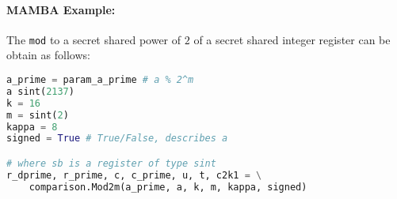  \iffalse
    ### NPS: This does not seem to be defined, or used
    \msubsubsection{$\mathsf{Mod2m}(a_{prime}, \sshare{a},k,\sshare{m}, \kappa)$:}
    This does the same operation as $\mathsf{Mod2m}$ above, but $m$ is now secret shared.
    \begin{enumerate}
      \item $\sshare{x_0},\ldots,\sshare{x_{k-1}}, \sshare{2^m} \asn \mathsf{B2U}(\sshare{m},k)$.
      \item $\sshare{2^{-m}} \asn \mathsf{Inv}(\sshare{2^m})$.
      \item $\sshare{r''}, \sshare{r}, \sshare{r}_B \asn \mathsf{PRandM}(k,k,\kappa)$.
      \item $\sshare{r'} \asn \sum_{i=0}^{k-1} 2^i \cdot \sshare{x_i} \cdot \sshare{r_i}$
      \item $c \asn \Open(\sshare{a}+\sshare{r''}+\sshare{r})$.
      \item For $i \in [1,\ldots,k=1]$ do $c_i' \asn c \pmod{2^i}$.
      \item $\sshare{c''} \asn \sum_{i=1}^{k-1} c_i' \cdot (\sshare{x_{i-1}}-\sshare{x_i})$.
      \item $\sshare{d} \asn \mathsf{LT}(\sshare{c''},\sshare{r'},k)$.
      \item $\sshare{b} \asn \sshare{c''}-\sshare{r'}+\sshare{2^m} \cdot \sshare{d}$.
      \item Return $\sshare{b}$.
    \end{enumerate}
  \fi

  \paragraph{MAMBA Example:} The \verb|mod| to a secret shared power of $2$ of a secret shared integer register can be obtain as follows:
  \begin{lstlisting}[language={python}]
a_prime = param_a_prime # a % 2^m
a sint(2137)
k = 16
m = sint(2)
kappa = 8
signed = True # True/False, describes a

# where sb is a register of type sint
r_dprime, r_prime, c, c_prime, u, t, c2k1 = \
    comparison.Mod2m(a_prime, a, k, m, kappa, signed)
\end{lstlisting}


